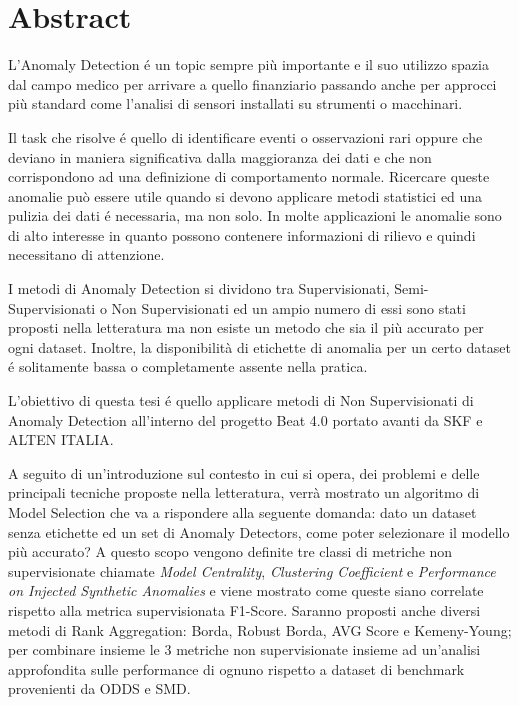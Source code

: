 \chapter*{Abstract}
L’Anomaly Detection é un topic sempre più importante e il suo utilizzo spazia dal campo medico per arrivare a quello finanziario passando anche per approcci più standard come l'analisi di sensori installati su strumenti o macchinari.

Il task che risolve é quello di identificare eventi o osservazioni rari oppure che deviano in maniera significativa dalla maggioranza dei dati e che non corrispondono ad una definizione di comportamento normale. Ricercare queste anomalie può essere utile quando si devono applicare metodi statistici ed una pulizia dei dati é necessaria, ma non solo. In molte applicazioni le anomalie sono di alto interesse in quanto possono contenere informazioni di rilievo e quindi necessitano di attenzione. 

I metodi di Anomaly Detection si dividono tra Supervisionati, Semi-Supervisionati o Non Supervisionati ed un ampio numero di essi sono stati proposti nella letteratura ma non esiste un metodo che sia il più accurato per ogni dataset. Inoltre, la disponibilità di etichette di anomalia per un certo dataset é solitamente bassa o completamente assente nella pratica. 


L’obiettivo di questa tesi é quello applicare metodi di Non Supervisionati di Anomaly Detection all'interno del progetto Beat 4.0 portato avanti da SKF e ALTEN ITALIA. 

A seguito di un'introduzione sul contesto in cui si opera, dei problemi e delle principali tecniche proposte nella letteratura, verrà mostrato un algoritmo di Model Selection che va a rispondere alla seguente domanda: dato un dataset senza etichette ed un set di Anomaly Detectors, come poter selezionare il modello più accurato? A questo scopo vengono definite tre classi di metriche non supervisionate chiamate \textit{Model Centrality}, \textit{Clustering Coefficient} e \textit{Performance on Injected Synthetic Anomalies} e viene mostrato come queste siano correlate rispetto alla metrica supervisionata F1-Score. Saranno proposti anche diversi metodi di Rank Aggregation: Borda, Robust Borda, AVG Score e Kemeny-Young; per combinare insieme le 3 metriche non supervisionate insieme ad un'analisi approfondita sulle performance di ognuno rispetto a dataset di benchmark provenienti da ODDS e SMD.

